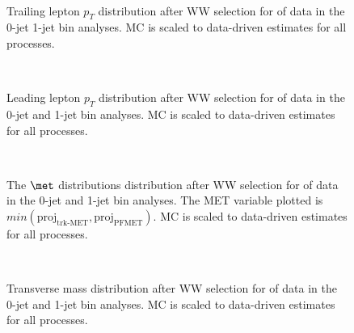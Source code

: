 \begin{figure}[!hbtp]
\centering
\subfigure[]{
\centering
\label{subfig:ww_ptmin_0j}
}
\subfigure[]{
\centering
\label{subfig:ww_ptmin_1j}
}\\
\caption{Trailing lepton $p_T$ distribution after WW selection for \intlumiEightTeV of data 
in the 0-jet  1-jet  bin analyses. 
MC is scaled to data-driven estimates for all processes.}
\label{fig:ww_ptmin}
\end{figure}

\begin{figure}[!hbtp]
\centering
\subfigure[]{
\centering
\label{subfig:ww_ptmax_0j}
}
\subfigure[]{
\centering
\label{subfig:ww_ptmax_1j}
}\\
\caption{Leading lepton $p_T$ distribution after WW selection for \intlumiEightTeV of data 
in the 0-jet  and 1-jet  bin analyses. 
MC is scaled to data-driven estimates for all processes.}
\label{fig:ww_ptmax}
\end{figure}

\begin{figure}[!hbtp]
\centering
\subfigure[]{
\centering
\label{subfig:ww_pmet_0j}
}
\subfigure[]{
\centering
\label{subfig:ww_pmet_1j}
}\\
\caption{The $\met$ distributions distribution after WW selection for \intlumiEightTeV of data 
in the 0-jet  and 1-jet  bin analyses. 
The MET variable plotted is $min(\text{proj}_\text{trk-MET}, \text{proj}_\text{PFMET})$. 
 MC is scaled to data-driven estimates for all processes.}
\label{fig:ww_pmet}
\end{figure}

\begin{figure}[!hbtp]
\centering
\subfigure[]{
\centering
\label{subfig:ww_mt_0j}
}
\subfigure[]{
\centering
\label{subfig:ww_mt_1j}
} \\
\caption{Transverse mass distribution after WW selection for \intlumiEightTeV of data 
in the 0-jet  and 1-jet  bin analyses. 
MC is scaled to data-driven estimates for all processes.}
\label{fig:ww_mt}
\end{figure}

